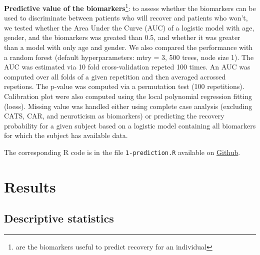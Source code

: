 \documentclass[12pt]{article}
\begin{document}
\clearpage

\textbf{Predictive value of the biomarkers}\footnote{are the biomarkers useful to
 predict recovery for an individual}: to assess whether the biomarkers
 can be used to discriminate between patients who will recover and
 patients who won't, we tested whether the Area Under the Curve (AUC)
 of a logistic model with age, gender, and the biomarkers was greated
 than 0.5, and whether it was greater than a model with only age and
 gender. We also compared the performance with a random forest
 (default hyperparameters: mtry = 3, 500 trees, node size 1). The AUC
 was estimated via 10 fold cross-validation repeted 100 times. An AUC
 was computed over all folds of a given repetition and then averaged
 acrossed repetions. The p-value was computed via a permutation test
 (100 repetitions). \newline Calibration plot were also computed using
 the local polynomial regression fitting (loess). \newline Missing
 value was handled either using complete case analysis (excluding
 CATS, CAR, and neuroticism as biomarkers) or predicting the recovery
 probability for a given subject based on a logistic model containing
 all biomarkers for which the subject has available data.

\bigskip

The corresponding R code is in the file \texttt{1-prediction.R} available on
\href{https://github.com/bozenne/article-predictionNP1BD3/code-data-analysis}{Github}.

\clearpage

\section{Results}
\label{sec:org3aa9c7f}

\subsection{Descriptive statistics}
\label{sec:org47b4198}
\end{document}
